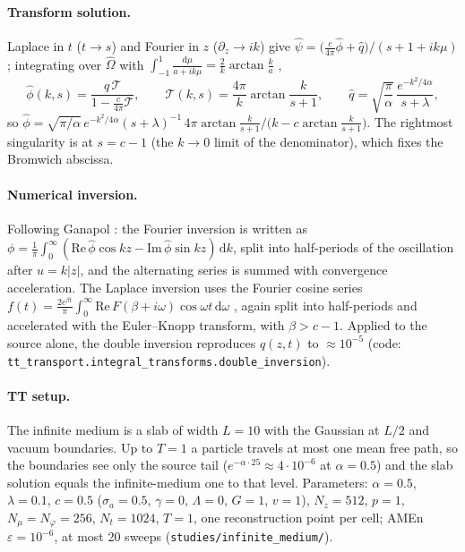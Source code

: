 \documentclass[11pt,a4paper]{article}
\newcommand{\Om}{\hat{\Omega}}
\newcommand{\dd}{\mathrm{d}}
\newcommand{\Lmax}{\Lambda}
\newcommand{\code}[1]{\texttt{#1}}
\begin{document}
\paragraph{Transform solution.} Laplace in $t$ ($t\to s$) and Fourier in $z$ ($\partial_z\to ik$) give $\hat\psi=\big(\frac{c}{4\pi}\hat\phi+\hat q\big)/(s+1+ik\mu)$; integrating over $\Om$ with $\int_{-1}^1\frac{\dd\mu}{a+ik\mu}=\frac2k\arctan\frac ka$ \cite{DM},
\begin{equation}
\hat\phi(k,s)=\frac{\hat q\,\mathcal T}{1-\frac{c}{4\pi}\mathcal T},\qquad
\mathcal T(k,s)=\frac{4\pi}{k}\arctan\frac{k}{s+1},\qquad
\hat q=\sqrt{\frac\pi\alpha}\,\frac{e^{-k^2/4\alpha}}{s+\lambda},
\end{equation}
so $\hat\phi=\sqrt{\pi/\alpha}\,e^{-k^2/4\alpha}(s+\lambda)^{-1}\,4\pi\arctan\frac{k}{s+1}\big/\big(k-c\arctan\frac{k}{s+1}\big)$. The rightmost singularity is at $s=c-1$ (the $k\to0$ limit of the denominator), which fixes the Bromwich abscissa.

\paragraph{Numerical inversion.} Following Ganapol \cite{Ganapol}: the Fourier inversion is written as $\phi=\frac1\pi\int_0^\infty(\mathrm{Re}\,\hat\phi\cos kz-\mathrm{Im}\,\hat\phi\sin kz)\,\dd k$, split into half-periods of the oscillation after $u=k|z|$, and the alternating series is summed with convergence acceleration. The Laplace inversion uses the Fourier cosine series $f(t)=\frac{2e^{\beta t}}{\pi}\int_0^\infty\mathrm{Re}\,F(\beta+i\omega)\cos\omega t\,\dd\omega$ \cite{DA}, again split into half-periods and accelerated with the Euler--Knopp transform, with $\beta>c-1$. Applied to the source alone, the double inversion reproduces $q(z,t)$ to $\approx10^{-5}$ (code: \code{tt\_transport.integral\_transforms.double\_inversion}).

\paragraph{TT setup.} The infinite medium is a slab of width $L=10$ with the Gaussian at $L/2$ and vacuum boundaries. Up to $T=1$ a particle travels at most one mean free path, so the boundaries see only the source tail ($e^{-\alpha\cdot25}\approx4\cdot10^{-6}$ at $\alpha=0.5$) and the slab solution equals the infinite-medium one to that level. Parameters: $\alpha=0.5$, $\lambda=0.1$, $c=0.5$ ($\sigma_{a}=0.5$, $\gamma=0$, $\Lmax=0$, $G=1$, $v=1$), $N_z=512$, $p=1$, $N_\mu=N_\varphi=256$, $N_t=1024$, $T=1$, one reconstruction point per cell; AMEn $\varepsilon=10^{-6}$, at most 20 sweeps (\code{studies/infinite\_medium/}).
\end{document}
